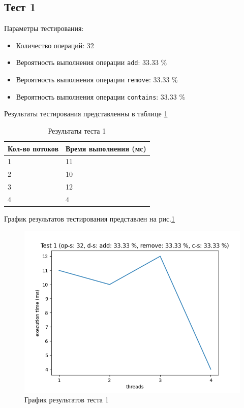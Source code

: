 \subsection*{Тест 1}

Параметры тестирования:

\begin{itemize}
    \item Количество операций: 32
    \item Вероятность выполнения операции \verb|add|: 33.33 \%
    \item Вероятность выполнения операции \verb|remove|: 33.33 \%
    \item Вероятность выполнения операции \verb|contains|: 33.33 \%
\end{itemize}

Результаты тестирования представленны в таблице \ref{tab:results1}


\begin{table}[H]
    \centering
    \begin{tabular}{|l|l|}
        \hline
        Кол-во потоков & Время выполнения (мс) \\
        \hline
        1 & 11 \\
        \hline
        2 & 10 \\
        \hline
        3 & 12 \\
        \hline
        4 & 4 \\
        \hline
    \end{tabular}
    \caption{Результаты теста 1}
    \label{tab:results1}
\end{table}
        

График результатов тестирования представлен на рис.\ref{fig:plot1}

\begin{figure}[H]
    \centering
    \includegraphics[width=0.7\linewidth]{photo/plot1}
    \caption{График результатов теста 1}
    \label{fig:plot1}
\end{figure}

